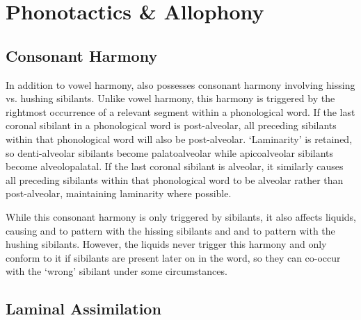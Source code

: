\documentclass[a4paper,11pt,oneside,openany]{memoir}
\begin{document}
\section{Phonotactics \& Allophony}\label{sec:allophony}



\subsection{Consonant Harmony}\label{ssec:consonant_harmony}

In addition to vowel harmony, \lang{} also possesses consonant harmony involving hissing vs. hushing sibilants. Unlike vowel harmony, this harmony is triggered by the rightmost occurrence of a relevant segment within a phonological word. If the last coronal sibilant in a phonological word is post-alveolar, all preceding sibilants within that phonological word will also be post-alveolar. `Laminarity' is retained, so denti-alveolar sibilants become palatoalveolar while apicoalveolar sibilants become alveolopalatal. If the last coronal sibilant is alveolar, it similarly causes all preceding sibilants within that phonological word to be alveolar rather than post-alveolar, maintaining laminarity where possible.

While this consonant harmony is only triggered by sibilants, it also affects liquids, causing  and  to pattern with the hissing sibilants and  and  to pattern with the hushing sibilants. However, the liquids never trigger this harmony and only conform to it if sibilants are present later on in the word, so they can co-occur with the `wrong' sibilant under some circumstances.

\subsection{Laminal Assimilation}
\end{document}
